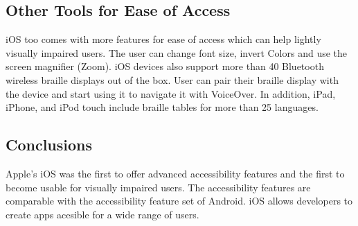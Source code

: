 \subsection{Other Tools for Ease of Access}
iOS too comes with more features for ease of access which can help lightly visually impaired users. The user can change font size, invert Colors and use the screen magnifier (Zoom).
iOS devices also support more than 40 Bluetooth wireless braille displays out of the box. User can pair their braille display with the device and start using it to navigate it with VoiceOver. In addition, iPad, iPhone, and iPod touch include braille tables for more than 25 languages.

\subsection{Conclusions}
Apple's iOS was the first to offer advanced accessibility features and the first to become usable for visually impaired users. The accessibility features are comparable with the accessibility feature set of Android. iOS allows developers to create apps acesible for a wide range of users.
\endinput